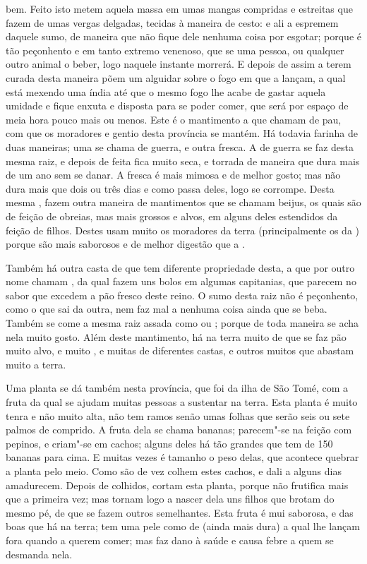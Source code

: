 bem. Feito isto metem aquela massa em umas mangas compridas e estreitas 
que fazem de umas vergas delgadas, tecidas à
maneira de cesto: e ali a espremem daquele sumo, de maneira que não
fique dele nenhuma coisa por esgotar; porque é tão peçonhento e em			%
tanto extremo venenoso, que se uma pessoa, ou qualquer outro animal o
beber, logo naquele instante morrerá. E depois de assim a terem curada
desta maneira põem um alguidar sobre o fogo em que a lançam, a qual
está mexendo uma índia até que o mesmo fogo lhe acabe de gastar aquela
umidade e fique enxuta e disposta para se poder comer, que será por
espaço de meia hora pouco mais ou menos. Este é o mantimento a que
chamam  de pau, com que os moradores e gentio desta província se					%
mantém. Há todavia farinha de duas maneiras; uma se chama de guerra, e
outra fresca.  A de guerra se faz desta mesma raiz, e depois de
feita fica muito seca, e torrada de maneira que dura mais de um ano sem
se danar. A fresca é mais mimosa e de melhor gosto; mas não dura mais
que dois ou três dias e como passa deles, logo se corrompe. Desta mesma
, fazem outra maneira de mantimentos que se chamam beijus, os		%
quais são de feição de obreias, mas mais grossos e alvos, em alguns
deles estendidos da feição de filhos. Destes usam muito os moradores da
terra (principalmente os da ) porque são mais
saborosos e de melhor digestão que a .

Também há outra casta de  que tem diferente propriedade desta, a
que por outro nome chamam , da qual fazem uns bolos em algumas
capitanias, que parecem no sabor que excedem a pão fresco deste reino. O
sumo desta raiz não é peçonhento, como o que sai da outra, nem faz mal
a nenhuma coisa ainda que se beba. Também se come a mesma raiz assada
como  ou ; porque de toda maneira se acha nela muito gosto.
Além deste mantimento, há na terra muito  de que se faz
pão muito alvo, e muito , e muitas  de diferentes castas, e
outros muitos  que abastam muito a terra.

Uma planta se dá também nesta província, que foi da ilha de São Tomé,			%
com a fruta da qual se ajudam muitas pessoas a sustentar na terra.			%
Esta planta é muito tenra e não muito alta, não tem ramos senão umas
folhas que serão seis ou sete palmos de comprido. A fruta dela se
chama bananas; parecem"-se na feição com pepinos, e criam"-se em cachos;		%
alguns deles há tão grandes que tem de 150 bananas para
cima. E muitas vezes é tamanho o peso delas, que acontece quebrar a
planta pelo meio. Como são de vez colhem estes cachos, e dali a alguns
dias amadurecem. Depois de colhidos, cortam esta planta, porque não
frutifica mais que a primeira vez; mas tornam logo a nascer dela uns
filhos que brotam do mesmo pé, de que se fazem outros semelhantes. Esta
fruta é mui saborosa, e das boas que há na terra; tem uma pele como de
 (ainda mais dura) a qual lhe lançam fora quando a querem comer;
mas faz dano à saúde e causa febre a quem se desmanda nela.

